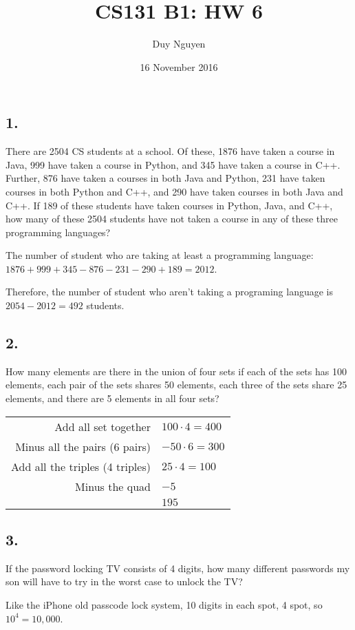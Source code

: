 \documentclass{article}
\title{CS131 B1: HW 6}
\author{Duy Nguyen}
\date{16 November 2016}
\begin{document}
\maketitle

\subsection*{1.}
There are 2504 CS students at a school. Of these, 1876 have taken a course in Java, 999 have
taken a course in Python, and 345 have taken a course in C++. Further, 876 have taken a courses
in both Java and Python, 231 have taken courses in both Python and C++, and 290 have taken
courses in both Java and C++. If 189 of these students have taken courses in Python, Java, and
C++, how many of these 2504 students have not taken a course in any of these three
programming languages?

The number of student who are taking at least a programming language: $1876 + 999 + 345 - 876 - 231 - 290 + 189 = 2012$.

Therefore, the number of student who aren't taking a programing language is $2054 - 2012 = 492$ students.

\subsection*{2.}
How many elements are there in the union of four sets if each of the sets has 100 elements,
each pair of the sets shares 50 elements, each three of the sets share 25 elements, and there
are 5 elements in all four sets?
\begin{center}
\begin{tabular}{r|l}
    Add all set together &  $100\cdot 4 = 400$ \\
    Minus all the pairs (6 pairs) & $- 50 \cdot 6 = 300 $\\
    Add all the triples (4 triples) & $ 25 \cdot 4 = 100$ \\
    Minus the quad & $-5$ \\ \hline
    & $195$
\end{tabular}
\end{center}
\subsection*{3.}
If the password locking TV consists of 4 digits, how many different passwords my son will have to try in the worst case to unlock the TV?

Like the iPhone old passcode lock system, 10 digits in each spot, 4 spot, so $10^4 = 10,000$.
\end{document}
